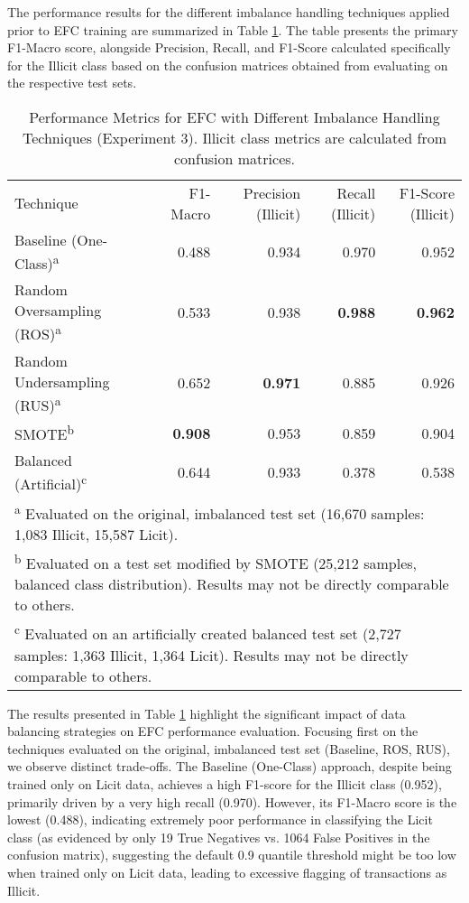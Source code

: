\documentclass[12pt]{article}
\begin{document}
The performance results for the different imbalance handling techniques applied prior to EFC training are summarized in
Table \ref{tab:exp3_imbalance_metrics}. The table presents the primary F1-Macro score, alongside Precision, Recall, and
F1-Score calculated specifically for the Illicit class based on the confusion matrices obtained from evaluating on the
respective test sets.

\begin{table}[htbp]
  \centering
  \caption{Performance Metrics for EFC with Different Imbalance Handling Techniques (Experiment 3). Illicit class metrics
    are calculated from confusion matrices.}
  \label{tab:exp3_imbalance_metrics}
  \begin{tabular}{lrrrr}
    Technique & F1-Macro & Precision (Illicit) & Recall (Illicit) & F1-Score (Illicit) \\
    Baseline (One-Class)\textsuperscript{a} & 0.488 & 0.934 & 0.970 & 0.952 \\
    Random Oversampling (ROS)\textsuperscript{a} & 0.533 & 0.938 & \textbf{0.988} & \textbf{0.962} \\
    Random Undersampling (RUS)\textsuperscript{a} & 0.652 & \textbf{0.971} & 0.885 & 0.926 \\
    SMOTE\textsuperscript{b} & \textbf{0.908} & 0.953 & 0.859 & 0.904 \\
    Balanced (Artificial)\textsuperscript{c} & 0.644 & 0.933 & 0.378 & 0.538 \\
    \multicolumn{5}{p{0.9\textwidth}}{\footnotesize \textsuperscript{a} Evaluated on the original, imbalanced test set (16,670 samples: 1,083 Illicit, 15,587 Licit).} \\
    \multicolumn{5}{p{0.9\textwidth}}{\footnotesize \textsuperscript{b} Evaluated on a test set modified by SMOTE (25,212 samples, balanced class distribution). Results may not be directly comparable to others.} \\
    \multicolumn{5}{p{0.9\textwidth}}{\footnotesize \textsuperscript{c} Evaluated on an artificially created balanced test set (2,727 samples: 1,363 Illicit, 1,364 Licit). Results may not be directly comparable to others.} \\
  \end{tabular}
\end{table}

The results presented in Table \ref{tab:exp3_imbalance_metrics} highlight the significant impact of data balancing strategies
on EFC performance evaluation. Focusing first on the techniques evaluated on the original, imbalanced test set (Baseline,
ROS, RUS), we observe distinct trade-offs. The Baseline (One-Class) approach, despite being trained only on Licit data,
achieves a high F1-score for the Illicit class (0.952), primarily driven by a very high recall (0.970). However, its F1-Macro
score is the lowest (0.488), indicating extremely poor performance in classifying the Licit class (as evidenced by only 19
True Negatives vs. 1064 False Positives in the confusion matrix), suggesting the default 0.9 quantile threshold might be
too low when trained only on Licit data, leading to excessive flagging of transactions as Illicit.
\end{document}
